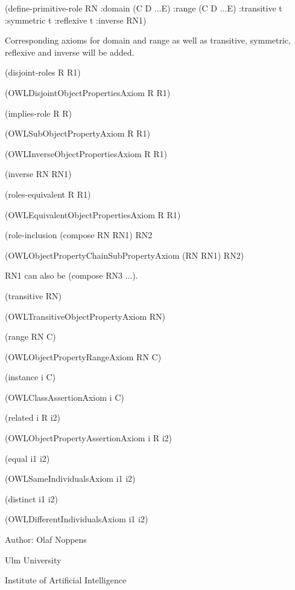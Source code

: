 (define-\/primitive-\/role R\-N \-:domain (C D ...E) \-:range (C D ...E) \-:transitive t \-:symmetric t \-:reflexive t \-:inverse R\-N1) 

Corresponding axioms for domain and range as well as transitive, symmetric, reflexive and inverse will be added.  

(disjoint-\/roles R R1) 

(O\-W\-L\-Disjoint\-Object\-Properties\-Axiom R R1) 

(implies-\/role R R) 

(O\-W\-L\-Sub\-Object\-Property\-Axiom R R1) 

(O\-W\-L\-Inverse\-Object\-Properties\-Axiom R R1)  

(inverse R\-N R\-N1) 

(roles-\/equivalent R R1) 

(O\-W\-L\-Equivalent\-Object\-Properties\-Axiom R R1) 

(role-\/inclusion (compose R\-N R\-N1) R\-N2 

(O\-W\-L\-Object\-Property\-Chain\-Sub\-Property\-Axiom (R\-N R\-N1) R\-N2) 

R\-N1 can also be (compose R\-N3 ...).  

(transitive R\-N) 

(O\-W\-L\-Transitive\-Object\-Property\-Axiom R\-N) 

(range R\-N C) 

(O\-W\-L\-Object\-Property\-Range\-Axiom R\-N C) 

(instance i C) 

(O\-W\-L\-Class\-Assertion\-Axiom i C) 

(related i R i2) 

(O\-W\-L\-Object\-Property\-Assertion\-Axiom i R i2) 

(equal i1 i2) 

(O\-W\-L\-Same\-Individuals\-Axiom i1 i2) 

(distinct i1 i2) 

(O\-W\-L\-Different\-Individuals\-Axiom i1 i2) 

Author\-: Olaf Noppens\par
 Ulm University\par
 Institute of Artificial Intelligence\par
 

